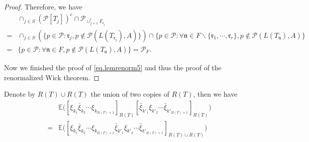 \begin{proof}
 Therefore, we have
 \begin{equation}
  \begin{split}
  &\cap_{j\in S}(\mathcal{P}[T_j])^c\cap \mathcal{P}_{\cup_{j=1}^r F_{\mathfrak{r}_{j}}}
  \\
  =&\cap_{j\in S} (\{p\in\mathcal{P}:\mathfrak{r}_j,p\notin \mathcal{P}(L(T_{\mathfrak{r}_j}),A)\}) \cap \{p\in\mathcal{P}:\forall \mathfrak{n}\in F\backslash \{\mathfrak{r}_1,\cdots,\mathfrak{r}_r\},p\notin \mathcal{P}(L(T_{\mathfrak{n}}),A)\}
  \\
  = & \{p\in\mathcal{P}:\forall \mathfrak{n}\in F,p\notin \mathcal{P}(L(T_{\mathfrak{n}}),A)\} = \mathcal{P}_F.
  \end{split}
 \end{equation}
 
 
 
 
 
 
 Now we finished the proof of \eqref{eq.lemrenorm5} and thus the proof of the renormalized Wick theorem.
 \end{proof}
 
 Denote by $R(T)\cup R(T)$ the union of two copies of $R(T)$, then we have 
 \begin{equation}
  \begin{split}
  &\mathbb{E}\Big([\xi_{k_1}\bar{\xi}_{k_2}\cdots\xi_{k_{2l(T)+1}}]_{R(T)}
  [\bar{\xi}_{k'_1}\xi_{k'_2}\cdots\bar{\xi}_{k'_{2l(T)+1}}]_{R(T)}\Big) 
  \\
  =& \mathbb{E}\Big([\xi_{k_1}\bar{\xi}_{k_2}\cdots\xi_{k_{2l(T)+1}}\bar{\xi}_{k'_1}\xi_{k'_2}\cdots\bar{\xi}_{k'_{2l(T)+1}}]_{R(T)\cup R(T)}\Big)
  \end{split}
 \end{equation}
 
